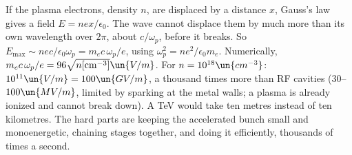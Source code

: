 If the plasma electrons, density $n$, are displaced by a distance $x$, Gauss's law gives a field $E = nex/\epsilon_0$. The wave cannot displace them by much more than its own wavelength over $2\pi$, about $c/\omega_p$, before it breaks. So $E_{\max}\sim nec/\epsilon_0\omega_p = m_ec\,\omega_p/e$, using $\omega_p^2 = ne^2/\epsilon_0m_e$. Numerically, $m_ec\,\omega_p/e = 96\sqrt{n[\mathrm{cm^{-3}}]}\un{V/m}$. For $n = 10^{18}\un{cm^{-3}}$: $10^{11}\un{V/m} = 100\un{GV/m}$, a thousand times more than RF cavities ($30$--$100\un{MV/m}$, limited by sparking at the metal walls; a plasma is already ionized and cannot break down). A TeV would take ten metres instead of ten kilometres. The hard parts are keeping the accelerated bunch small and monoenergetic, chaining stages together, and doing it efficiently, thousands of times a second.
